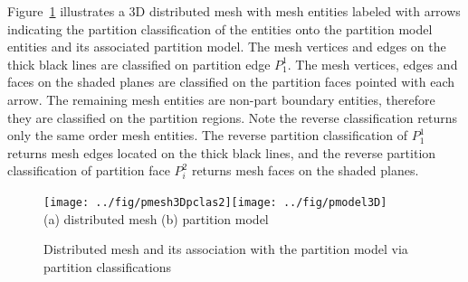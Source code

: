 Figure~\ref{fig:pmeshwithpclas} illustrates a 3D distributed mesh with mesh entities labeled
with arrows indicating the partition classification of the entities onto the
partition model entities and its associated partition model. The mesh
vertices and edges on the thick black lines are classified on
partition edge $P^1_1$. The mesh
vertices, edges and faces on the shaded
planes are classified on the partition faces pointed with each arrow. The remaining
mesh entities are non-part boundary 
entities, therefore they are classified on the partition regions. Note the reverse
classification returns only the same order mesh entities. The reverse partition classification of
$P^1_1$ returns mesh edges located 
on the thick black lines, and the reverse partition classification of partition
face $P^2_i$ returns mesh faces on the shaded planes.

\begin{figure}
\centering
\texttt{[image: ../fig/pmesh3Dpclas2]}\hspace{.3in}\texttt{[image: ../fig/pmodel3D]}\\
\vspace{5pt}(a) distributed mesh \hspace{1in}(b) partition model\\
\vspace{7pt}
\caption{Distributed mesh and its association with the partition model via partition classifications}
\label{fig:pmeshwithpclas}
\end{figure}

